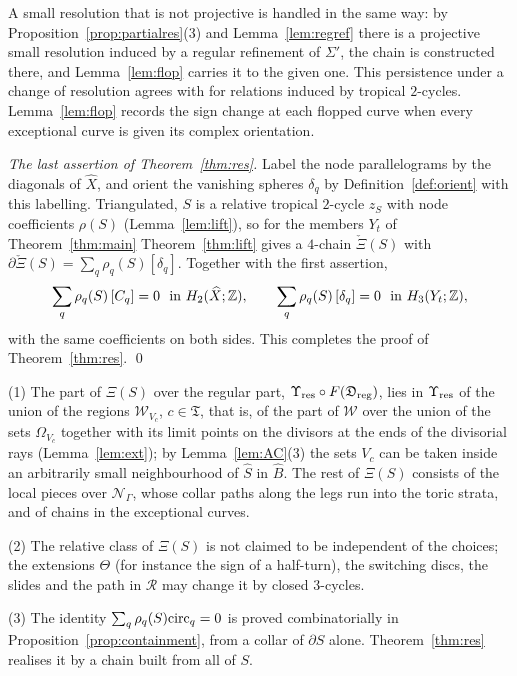 A small resolution that is not projective is handled in the same way: by Proposition~\ref{prop:partialres}(3) and
Lemma~\ref{lem:regref} there is a projective small resolution induced by a regular refinement of $\Sigma'$, the chain is constructed there, and Lemma~\ref{lem:flop} carries it to
the given one. This persistence under a change of resolution agrees with \cite[Rem.~9.4]{CBM} for relations induced by
tropical $2$-cycles. Lemma~\ref{lem:flop} records the sign change at each flopped curve when every exceptional curve is
given its complex orientation.

\emph{The last assertion of Theorem~\ref{thm:res}.} Label the node parallelograms by the diagonals of $\widehat X$, and orient
the vanishing spheres $\delta_q$ by Definition~\ref{def:orient} with this labelling. Triangulated, $S$ is a relative tropical
$2$-cycle $z_S$ with node coefficients $\rho(S)$ (Lemma~\ref{lem:lift}), so for the members $Y_t$ of Theorem~\ref{thm:main}
Theorem~\ref{thm:lift} gives a $4$-chain $\check\Xi(S)$ with $\partial\check\Xi(S)=\sum_q\rho_q(S)[\delta_q]$. Together with the
first assertion,
\[
\sum_q\rho_q(S)\,[C_q]=0\ \text{ in }H_2(\widehat X;\mathbb Z),\qquad\sum_q\rho_q(S)\,[\delta_q]=0\ \text{ in }H_3(Y_t;\mathbb Z),
\]
with the same coefficients on both sides. This completes the proof of Theorem~\ref{thm:res}. \qed

\begin{remark}\label{rem:res-choices}
(1) The part of $\Xi(S)$ over the regular part, $\Upsilon_{\rm res}\circ F(\mathfrak D_{\rm reg})$, lies in $\Upsilon_{\rm res}$ of
the union of the regions $\mathscr W_{V_c}$, $c\in\mathfrak T$, that is, of the part of $\mathscr W$ over the union of the sets $\Omega_{V_c}$
together with its limit points on the divisors at the ends of the divisorial rays (Lemma~\ref{lem:ext}); by Lemma~\ref{lem:AC}(3)
the sets $V_c$ can be taken inside an arbitrarily small neighbourhood of $\hat S$ in $\widehat B$. The rest of $\Xi(S)$
consists of the local pieces over $\mathcal N_\Gamma$, whose collar paths along the legs run into the toric strata, and of
chains in the exceptional curves.

(2) The relative class of $\Xi(S)$ is not claimed to be independent of the choices; the extensions $\Theta$ (for instance the
sign of a half-turn), the switching discs, the slides and the path in $\mathcal R$ may change it by closed $3$-cycles.

(3) The identity $\sum_q\rho_q(S)\mathrm{circ}_q=0$ is proved combinatorially in Proposition~\ref{prop:containment}, from a collar of
$\partial S$ alone. Theorem~\ref{thm:res} realises it by a chain built from all of $S$.
\end{remark}

